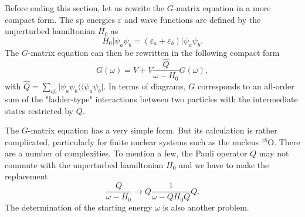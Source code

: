 \documentclass[%
oneside,                 %
final,                   %
10pt]{article}
\begin{document}
Before ending this section, let us rewrite the $G$-matrix equation
in a more compact form.
The sp energies $\varepsilon$ and wave functions are defined
by the unperturbed hamiltonian $H_0$ as
\begin{equation}
   H_0\vert \psi_a\psi_b=(\varepsilon_a+\varepsilon_b)
   \vert \psi_a\psi_b.
\end{equation}
The $G$-matrix equation can then be rewritten in the following
compact form
\begin{equation}
   G(\omega )=V+V\frac{\hat{Q}}{\omega -H_0}G(\omega ),
\end{equation}
with
$\hat{Q}=\sum_{ab}\vert \psi_a\psi_b\langle\langle \psi_a\psi_b\vert$.
In terms of diagrams, $G$ corresponds to an all-order sum of the
"ladder-type" interactions between two particles with the
intermediate states restricted by $Q$.

The $G$-matrix equation has a very simple form. But its
calculation is rather complicated, particularly for finite
nuclear systems such as the nucleus $^{18}$O. There are a
number of complexities. To mention a few, the Pauli operator
$Q$ may not commute with the unperturbed hamiltonian
$H_0$ and we have to make the replacement
\[
\frac{Q}{\omega -H_0}\rightarrow Q\frac{1}{\omega -QH_0Q}Q.
\]
The determination of the starting energy $\omega$ is also another
problem. 
\end{document}
